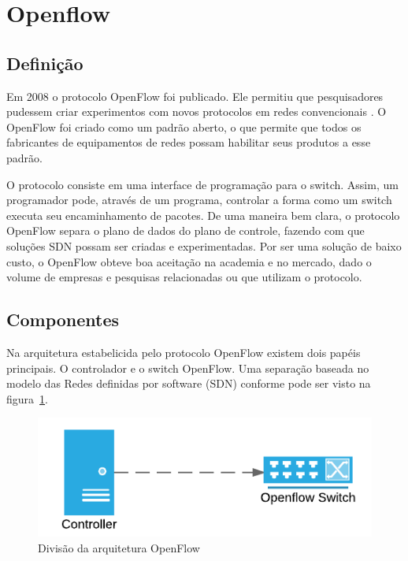 \section{Openflow}



\subsection{Definição}

Em 2008 o protocolo OpenFlow foi publicado. Ele permitiu que pesquisadores
pudessem criar experimentos com novos protocolos em redes convencionais
\citep{nick2008openflow}.
O OpenFlow foi criado como um padrão aberto, o que permite que todos os 
fabricantes de equipamentos de redes possam habilitar seus produtos a esse 
padrão.

O protocolo consiste em uma interface de programação para o switch. 
Assim, um programador pode, através de um programa, controlar a forma como 
um switch executa seu encaminhamento de pacotes. 
De uma maneira bem clara, o protocolo OpenFlow separa o plano de dados
do plano de controle, fazendo com que soluções SDN possam ser criadas 
e experimentadas.
Por ser uma solução de baixo custo, o OpenFlow obteve boa aceitação na 
academia e no mercado, dado o volume de empresas e pesquisas relacionadas
ou que utilizam o protocolo.

\subsection{Componentes}

Na arquitetura estabelicida pelo protocolo OpenFlow existem dois papéis
principais.
O controlador e o switch OpenFlow. 
Uma separação baseada no modelo das Redes definidas por software (SDN)
conforme pode ser visto na figura~\ref{fig:of-arch}.

\begin{figure}[h!]
    \centering
    \label{fig:of-arch}
    \includegraphics{img/openflow-architecture}
    \caption{Divisão da arquitetura OpenFlow}
\end{figure}

